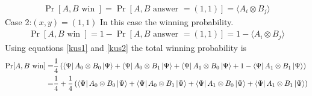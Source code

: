\begin{align}\label{kus1}
\Pr[ A,B \text{ win }]=\Pr[ A,B \text{ answer }= (1,1)]=\langle A_i\otimes B_j\rangle
\end{align}
Case 2:$ (x,y)= (1,1)$
In this case the winning probability.
\begin{align}\label{kus2}
\Pr[ A,B \text{ win }]=1-\Pr[ A,B \text{ answer }= (1,1)]=1-\langle A_i\otimes B_j\rangle
\end{align}
Using equations \ref{kus1}  and  \ref{kus2} the total winning probability is
\begin{align}
\Pr[ A,B \text{ win}]=&\frac{1}{4}\left (\bra{\Psi}A_0\otimes B_0\ket{\Psi}+\bra{\Psi}A_0\otimes B_1\ket{\Psi}+\bra{\Psi}A_1\otimes B_0\ket{\Psi}+1-\bra{\Psi}A_1\otimes B_1\ket{\Psi}\right)\nonumber\\
=&\frac{1}{4}+\frac{1}{4}\left (\bra{\Psi}A_0\otimes B_0\ket{\Psi}+\bra{\Psi}A_0\otimes B_1\ket{\Psi}+\bra{\Psi}A_1\otimes B_0\ket{\Psi}+\bra{\Psi}A_1\otimes B_1\ket{\Psi}\right)\label{pree}
\end{align}
%
%
